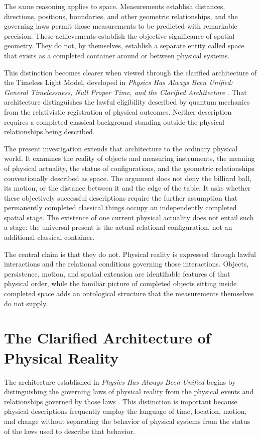 \documentclass[12pt,onecolumn]{article}
\begin{document}
The same reasoning applies to space. Measurements establish distances, directions, positions, boundaries, and other geometric relationships, and the governing laws permit those measurements to be predicted with remarkable precision. These achievements establish the objective significance of spatial geometry. They do not, by themselves, establish a separate entity called space that exists as a completed container around or between physical systems.

This distinction becomes clearer when viewed through the clarified architecture of the Timeless Light Model, developed in \textit{Physics Has Always Been Unified: General Timelessness, Null Proper Time, and the Clarified Architecture} \cite{Unified2026}. That architecture distinguishes the lawful eligibility described by quantum mechanics from the relativistic registration of physical outcomes. Neither description requires a completed classical background standing outside the physical relationships being described.

The present investigation extends that architecture to the ordinary physical world. It examines the reality of objects and measuring instruments, the meaning of physical actuality, the status of configurations, and the geometric relationships conventionally described as space. The argument does not deny the billiard ball, its motion, or the distance between it and the edge of the table. It asks whether these objectively successful descriptions require the further assumption that permanently completed classical things occupy an independently completed spatial stage. The existence of one current physical actuality does not entail such a stage: the universal present is the actual relational configuration, not an additional classical container.

The central claim is that they do not. Physical reality is expressed through lawful interactions and the relational conditions governing those interactions. Objects, persistence, motion, and spatial extension are identifiable features of that physical order, while the familiar picture of completed objects sitting inside completed space adds an ontological structure that the measurements themselves do not supply.

\section{The Clarified Architecture of Physical Reality}

The architecture established in \textit{Physics Has Always Been Unified} begins by distinguishing the governing laws of physical reality from the physical events and relationships governed by those laws \cite{Unified2026}. This distinction is important because physical descriptions frequently employ the language of time, location, motion, and change without separating the behavior of physical systems from the status of the laws used to describe that behavior.
\end{document}

